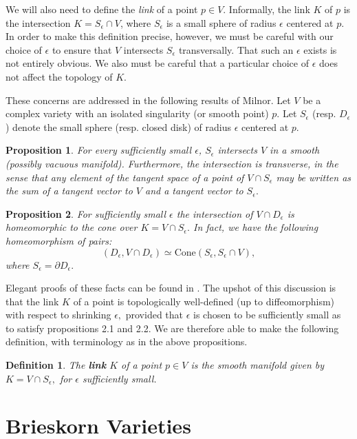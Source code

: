 \documentclass{article}
\newtheorem{proposition}{Proposition}[section]
\newtheorem{definition}{Definition}[section]
\begin{document}
We will also need to define the \textit{link} of a point $p \in V$. Informally, the link $K$ of $p$ is the intersection $K= S_{\epsilon} \cap V$, where $S_{\epsilon}$ is a small sphere of radius $\epsilon$ centered at $p$. In order to make this definition precise, however, we must be careful with our choice of $\epsilon$ to ensure that $V$ intersects $S_\epsilon$ transversally. That such an $\epsilon$ exists is not entirely obvious. We also must be careful that a particular choice of $\epsilon$ does not affect the topology of $K$. 

These concerns are addressed in the following results of Milnor\cite{milnor_1968}. Let $V$ be a complex variety with an isolated singularity (or smooth point) $p$. Let $S_\epsilon$ (resp. $D_{\epsilon}$) denote the small sphere (resp. closed disk) of radius $\epsilon$ centered at $p$.
\begin{proposition}
For every sufficiently small $\epsilon$, $S_\epsilon$ intersects $V$ in a smooth (possibly vacuous manifold). Furthermore, the intersection is transverse, in the sense that any element of the tangent space of a point of $V \cap S_\epsilon$ may be written as the sum of a tangent vector to $V$ and a tangent vector to $S_{\epsilon}.$
\end{proposition}
\begin{proposition}
\label{2.2}
For sufficiently small $\epsilon$ the intersection of $V \cap D_{\epsilon}$ is homeomorphic to the cone over $K = V \cap S_{\epsilon}.$ In fact, we have the following homeomorphism of pairs:
\[(D_{\epsilon}, V \cap D_{\epsilon}) \simeq \mathrm{Cone}(S_{\epsilon}, S_{\epsilon} \cap V),\]
where $S_{\epsilon} = \partial D_{\epsilon}.$
\end{proposition}

Elegant proofs of these facts can be found in \cite{milnor_1968}. The upshot of this discussion is that the link $K$ of a point is topologically well-defined (up to diffeomorphism) with respect to shrinking $\epsilon,$ provided that $\epsilon$ is chosen to be sufficiently small as to satisfy propositions 2.1 and 2.2. We are therefore able to make the following definition, with terminology as in the above propositions.
\begin{definition}
The \textbf{link} $K$ of a point $p \in V$ is the smooth manifold given by $K = V \cap S_{\epsilon},$ for $\epsilon$ sufficiently small.
\end{definition}

\section{Brieskorn Varieties}
\end{document}

